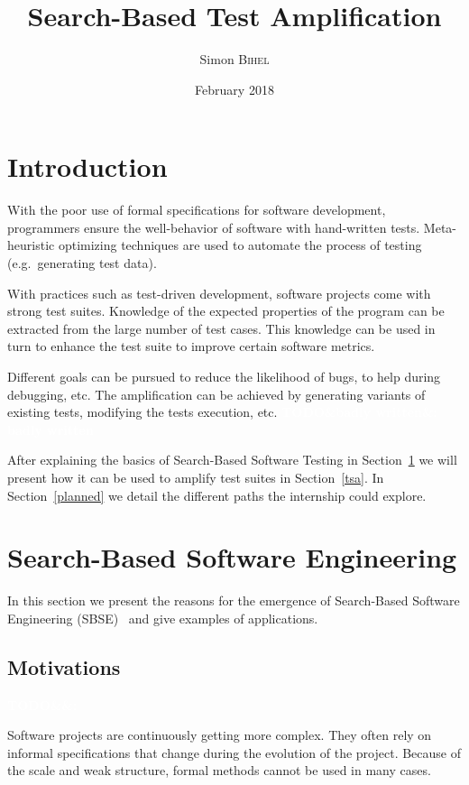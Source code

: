 \documentclass[11pt]{sdm}
\title{Search-Based Test Amplification}
\author{Simon \textsc{Bihel}}
\date{February 2018}
\newcommand{\todo}[1]{\colorbox{Red!75}{\textcolor{white}{\textbf{TODO\ifx&#1&\else: #1\fi}}}}
\begin{document}
\maketitle

\section*{Introduction}
\label{intro}

With the poor use of formal specifications for software development, programmers ensure the well-behavior of software with hand-written tests.
Meta-heuristic optimizing techniques are used to automate the process of testing (e.g.\ generating test data).

With practices such as test-driven development, software projects come with strong test suites.
Knowledge of the expected properties of the program can be extracted from the large number of test cases.
This knowledge can be used in turn to enhance the test suite to improve certain software metrics.

Different goals can be pursued to reduce the likelihood of bugs, to help during debugging, etc.
The amplification can be achieved by generating variants of existing tests, modifying the tests execution, etc.
\todo{badly written}

After explaining the basics of Search-Based Software Testing in Section~\ref{sbse} we will present how it can be used to amplify test suites in Section~\ref{tsa}.
In Section~\ref{planned} we detail the different paths the internship could explore.


\section{Search-Based Software Engineering}
\label{sbse}

In this section we present the reasons for the emergence of Search-Based Software Engineering (SBSE)~\cite{harman2001search,mcminn2011search} and give examples of applications.

\subsection{Motivations}
\label{motiv}
\todo{}

Software projects are continuously getting more complex.
They often rely on informal specifications that change during the evolution of the project.
Because of the scale and weak structure, formal methods cannot be used in many cases.
\end{document}

